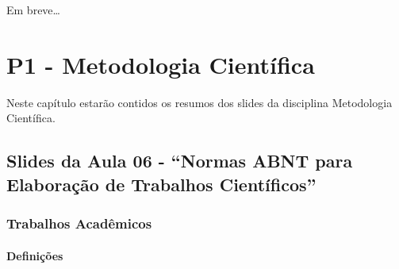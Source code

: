 \documentclass[
]{book}
\begin{document}
Em breve\ldots{}

\hypertarget{p1---metodologia-cientuxedfica}{%
\chapter{P1 - Metodologia Científica}\label{p1---metodologia-cientuxedfica}}

Neste capítulo estarão contidos os resumos dos slides da disciplina Metodologia Científica.

\hypertarget{slides-da-aula-06---normas-abnt-para-elaborauxe7uxe3o-de-trabalhos-cientuxedficos}{%
\section{Slides da Aula 06 - ``Normas ABNT para Elaboração de Trabalhos Científicos''}\label{slides-da-aula-06---normas-abnt-para-elaborauxe7uxe3o-de-trabalhos-cientuxedficos}}

\hypertarget{trabalhos-acaduxeamicos}{%
\subsection{Trabalhos Acadêmicos}\label{trabalhos-acaduxeamicos}}

\hypertarget{definiuxe7uxf5es}{%
\subsubsection{Definições}\label{definiuxe7uxf5es}}
\end{document}

